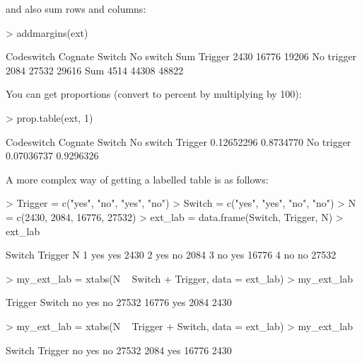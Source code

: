 \documentclass[a4paper,10pt]{article}
\begin{document}
and also sum rows and columns:
\begin{Schunk}
\begin{Sinput}
> addmargins(ext)
\end{Sinput}
\begin{Soutput}
            Codeswitch
Cognate      Switch No switch   Sum
  Trigger      2430     16776 19206
  No trigger   2084     27532 29616
  Sum          4514     44308 48822
\end{Soutput}
\end{Schunk}

You can get proportions (convert to percent by multiplying by 100):
\begin{Schunk}
\begin{Sinput}
> prop.table(ext, 1)
\end{Sinput}
\begin{Soutput}
            Codeswitch
Cognate          Switch No switch
  Trigger    0.12652296 0.8734770
  No trigger 0.07036737 0.9296326
\end{Soutput}
\end{Schunk}

A more complex way of getting a labelled table is as follows:
\begin{Schunk}
\begin{Sinput}
> Trigger = c("yes", "no", "yes", "no")
> Switch = c("yes", "yes", "no", "no")
> N = c(2430, 2084, 16776, 27532)
> ext_lab = data.frame(Switch, Trigger, N)
> ext_lab
\end{Sinput}
\begin{Soutput}
  Switch Trigger     N
1    yes     yes  2430
2    yes      no  2084
3     no     yes 16776
4     no      no 27532
\end{Soutput}
\begin{Sinput}
> my_ext_lab = xtabs(N ~ Switch + Trigger, data = ext_lab)
> my_ext_lab
\end{Sinput}
\begin{Soutput}
      Trigger
Switch    no   yes
   no  27532 16776
   yes  2084  2430
\end{Soutput}
\begin{Sinput}
> my_ext_lab = xtabs(N ~ Trigger + Switch, data = ext_lab)
> my_ext_lab
\end{Sinput}
\begin{Soutput}
       Switch
Trigger    no   yes
    no  27532  2084
    yes 16776  2430
\end{Soutput}
\end{Schunk}
\end{document}
